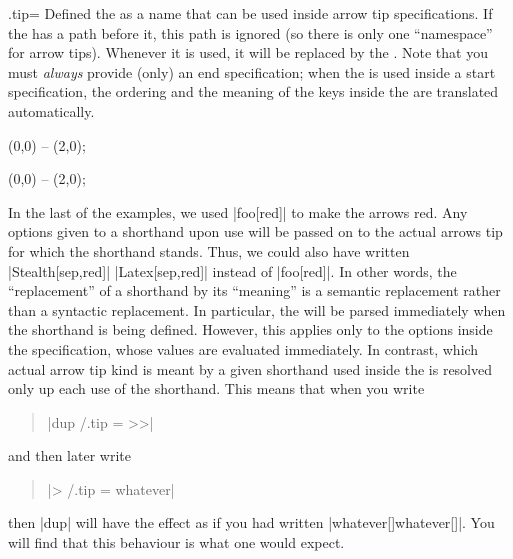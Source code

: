 \begin{handler}{{.tip}{=}}
  Defined the  as a name that can be used inside arrow tip
  specifications. If the  has a path before it, this path is
  ignored (so there is only one ``namespace'' for arrow
  tips). Whenever it is used, it will be replaced by the   . Note that you must \emph{always} provide
  (only) an end specification; when the  is used inside a
  start specification, the ordering and the meaning of the keys inside
  the  are translated automatically.

\begin{codeexample}[]
\tikz [foo /.tip = {Stealth[sep]. >>}]
  \draw [-foo] (0,0) -- (2,0);  
\end{codeexample}
\begin{codeexample}[]
\tikz [foo /.tip = {Stealth[sep] Latex[sep]},
       bar /.tip = {Stealth[length=10pt,open]}]
   (0,0) -- (2,0);  
\end{codeexample}

  In the last of the examples, we used |foo[red]| to make the arrows
  red. Any options given to a shorthand upon use will be passed on to
  the actual arrows tip for which the shorthand stands. Thus, we could
  also have written |Stealth[sep,red]| |Latex[sep,red]| instead of
  |foo[red]|. In other words, the ``replacement'' of a shorthand by
  its ``meaning'' is a semantic replacement rather than a syntactic
  replacement. In particular, the  will be
  parsed immediately when the shorthand is being defined. However,
  this applies only to the options inside the specification, whose
  values are evaluated immediately. In contrast, which actual arrow
  tip kind is meant by a given shorthand used inside the  is resolved only up each use of the shorthand. This
  means that when you write
  \begin{quote}
    |dup /.tip = >>|
  \end{quote}
  and then later write
  \begin{quote}
    |> /.tip = whatever|
  \end{quote}
  then |dup| will have the effect as if you had written
  |whatever[]whatever[]|. You will find that this behaviour is 
  what one would expect.


\end{handler}
